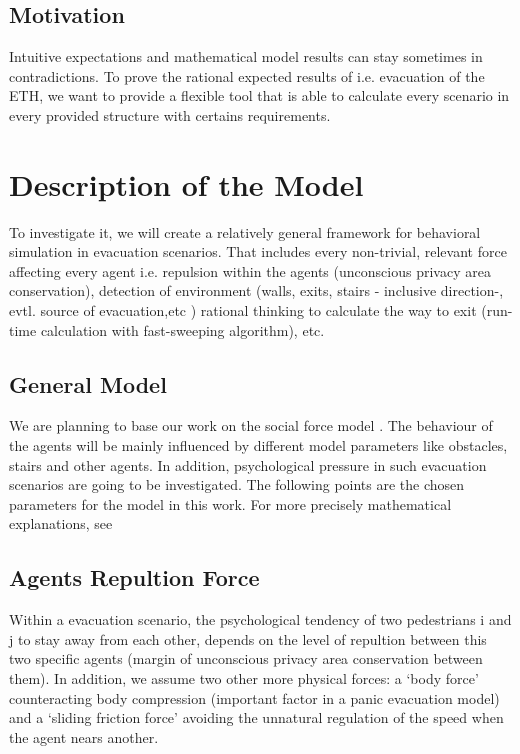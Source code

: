 \documentclass[11pt]{article}
\begin{document}
\subsection{Motivation}

Intuitive expectations and mathematical model results can stay sometimes in contradictions. To prove the rational expected results of i.e. evacuation of the ETH, we want to provide a flexible tool that is able to calculate every scenario in every provided structure with certains requirements.

\section{Description of the Model}


To investigate it, we will create a relatively general framework for behavioral simulation in evacuation scenarios. That includes every non-trivial, relevant force affecting every agent i.e. repulsion within the agents (unconscious privacy area conservation), detection of environment (walls, exits, stairs - inclusive direction-, evtl. source of evacuation,etc ) rational thinking to calculate the way to exit (run-time calculation with fast-sweeping algorithm), etc.


\subsection{General Model}

We are planning to base our work on the social force model \cite{SFMPD}. The  behaviour of the agents will be mainly influenced by different model parameters like obstacles, stairs and other agents. In addition, psychological pressure in such evacuation scenarios are going to be investigated. The following points are the chosen parameters for the model in this work. For more precisely mathematical explanations, see \cite{SFMPD}




\subsection*{Agents Repultion Force}

Within a evacuation scenario, the psychological tendency of two pedestrians i and j to stay away from each other, depends on the level of repultion between this two specific agents (margin of unconscious privacy area conservation between them). In addition, we assume two other more physical forces: a `body force' counteracting body compression (important factor in a panic evacuation model) and a `sliding friction force' avoiding the unnatural regulation of the speed when the agent nears another. 
\end{document}
